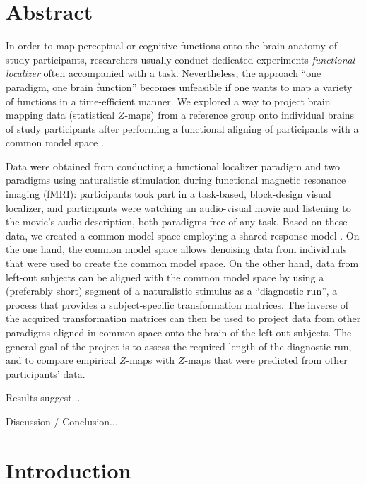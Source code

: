\section{Abstract}
In order to map perceptual or cognitive functions onto the brain anatomy of
study participants, researchers usually conduct dedicated experiments
\textit{functional localizer} often accompanied with a task.
Nevertheless, the approach ``one paradigm, one brain function'' becomes
unfeasible if one wants to map a variety of functions in a time-efficient
manner.
We explored a way to project brain mapping data (statistical $Z$-maps) from a
reference group onto individual brains of study participants after performing a
functional aligning of participants with a common model space .

%
Data were obtained from conducting a functional localizer paradigm and two
paradigms using naturalistic stimulation during functional magnetic resonance
imaging (fMRI):
%
participants took part in a task-based, block-design visual localizer, and
participants were watching an audio-visual movie and listening to the movie's
audio-description, both paradigms free of any task.
%
Based on these data, we created a common model space employing a shared response
model \citep{chen2015reduced}.
%
On the one hand, the common model space allows denoising data from individuals
that were used to create the common model space.
%
On the other hand, data from left-out subjects can be aligned with the common
model space by using a (preferably short) segment of a naturalistic stimulus as
a ``diagnostic run'', a process that provides a subject-specific transformation
matrices.
%
The inverse of the acquired transformation matrices can then be used to project
data from other paradigms aligned in common space onto the brain of the left-out
subjects.
%
The general goal of the project is to assess the required length of the
diagnostic run, and to compare empirical $Z$-maps with $Z$-maps that were
predicted from other participants' data.

%
Results suggest...

%
Discussion / Conclusion...


\section{Introduction}


